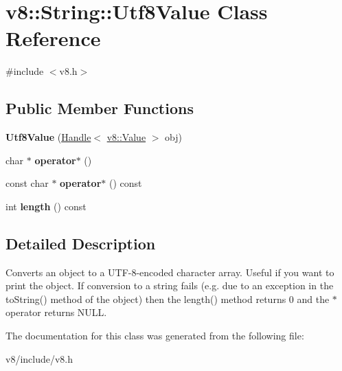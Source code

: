 \hypertarget{classv8_1_1String_1_1Utf8Value}{\section{v8\-:\-:String\-:\-:Utf8\-Value Class Reference}
\label{classv8_1_1String_1_1Utf8Value}
}


{\ttfamily \#include $<$v8.\-h$>$}

\subsection*{Public Member Functions}
\begin{DoxyCompactItemize}
\item 
\hypertarget{classv8_1_1String_1_1Utf8Value_aded9fd7ed406e79d5bc40eca15b6b3d7}{{\bfseries Utf8\-Value} (\hyperlink{classv8_1_1Handle}{Handle}$<$ \hyperlink{classv8_1_1Value}{v8\-::\-Value} $>$ obj)}\label{classv8_1_1String_1_1Utf8Value_aded9fd7ed406e79d5bc40eca15b6b3d7}

\item 
\hypertarget{classv8_1_1String_1_1Utf8Value_a6cb4914bc426bbe60b0dfdff32213e59}{char $\ast$ {\bfseries operator$\ast$} ()}\label{classv8_1_1String_1_1Utf8Value_a6cb4914bc426bbe60b0dfdff32213e59}

\item 
\hypertarget{classv8_1_1String_1_1Utf8Value_a6557ad0916c472faebd8bfdc3da5c4f7}{const char $\ast$ {\bfseries operator$\ast$} () const }\label{classv8_1_1String_1_1Utf8Value_a6557ad0916c472faebd8bfdc3da5c4f7}

\item 
\hypertarget{classv8_1_1String_1_1Utf8Value_a1e2572abf6adc0786769482df9906f19}{int {\bfseries length} () const }\label{classv8_1_1String_1_1Utf8Value_a1e2572abf6adc0786769482df9906f19}

\end{DoxyCompactItemize}


\subsection{Detailed Description}
Converts an object to a U\-T\-F-\/8-\/encoded character array. Useful if you want to print the object. If conversion to a string fails (e.\-g. due to an exception in the to\-String() method of the object) then the length() method returns 0 and the $\ast$ operator returns N\-U\-L\-L. 

The documentation for this class was generated from the following file\-:\begin{DoxyCompactItemize}
\item 
v8/include/v8.\-h\end{DoxyCompactItemize}
